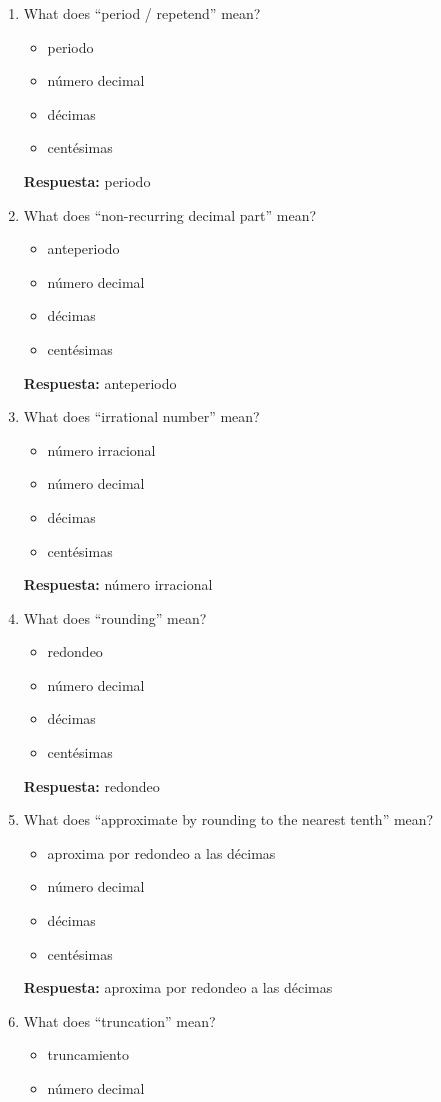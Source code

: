 \documentclass[11pt,a4paper]{article}
\begin{document}
\begin{enumerate}
\textbf{Respuesta:} decimal periódico mixto
\item What does ``period / repetend'' mean?
\begin{itemize}
\item periodo
\item número decimal
\item décimas
\item centésimas
\end{itemize}
\textbf{Respuesta:} periodo
\item What does ``non-recurring decimal part'' mean?
\begin{itemize}
\item anteperiodo
\item número decimal
\item décimas
\item centésimas
\end{itemize}
\textbf{Respuesta:} anteperiodo
\item What does ``irrational number'' mean?
\begin{itemize}
\item número irracional
\item número decimal
\item décimas
\item centésimas
\end{itemize}
\textbf{Respuesta:} número irracional
\item What does ``rounding'' mean?
\begin{itemize}
\item redondeo
\item número decimal
\item décimas
\item centésimas
\end{itemize}
\textbf{Respuesta:} redondeo
\item What does ``approximate by rounding to the nearest tenth'' mean?
\begin{itemize}
\item aproxima por redondeo a las décimas
\item número decimal
\item décimas
\item centésimas
\end{itemize}
\textbf{Respuesta:} aproxima por redondeo a las décimas
\item What does ``truncation'' mean?
\begin{itemize}
\item truncamiento
\item número decimal

\end{itemize}
\end{enumerate}
\end{document}
